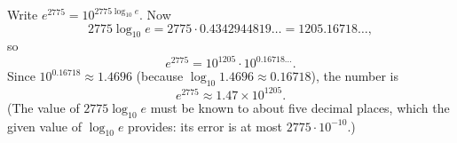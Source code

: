 Write $e^{2775}=10^{2775\log_{10}e}$. Now
\[
2775\log_{10}e=2775\cdot0.4342944819\ldots=1205.16718\ldots,
\]
so
\[
e^{2775}=10^{1205}\cdot10^{0.16718\ldots}.
\]
Since $10^{0.16718}\approx1.4696$ (because $\log_{10}1.4696\approx0.16718$), the number is
\[
e^{2775}\approx\boxed{1.47\times10^{1205}}.
\]
(The value of $2775\log_{10}e$ must be known to about five decimal places, which the given value of $\log_{10}e$ provides: its error is at most $2775\cdot10^{-10}$.)
